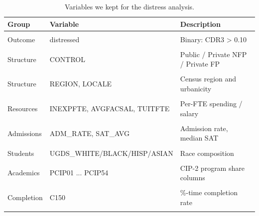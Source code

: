 \documentclass[
]{article}
\begin{document}
\begin{longtable}[t]{>{\raggedright\arraybackslash}p{1.8cm}>{\raggedright\arraybackslash}p{4.5cm}>{\raggedright\arraybackslash}p{7cm}}
\caption{\label{tab:var-table}Variables we kept for the distress analysis.}\\
\toprule
Group & Variable & Description\\
\midrule
\cellcolor{gray!10}{Outcome} & \cellcolor{gray!10}{CDR3} & \cellcolor{gray!10}{3-yr cohort default rate}\\
Outcome & distressed & Binary: CDR3 > 0.10\\
\cellcolor{gray!10}{Identifier} & \cellcolor{gray!10}{UNITID, OPEID, INSTNM} & \cellcolor{gray!10}{Institution ID and name}\\
Structure & CONTROL & Public / Private NFP / Private FP\\
\cellcolor{gray!10}{Structure} & \cellcolor{gray!10}{PREDDEG} & \cellcolor{gray!10}{Predominant degree awarded}\\
\addlinespace
Structure & REGION, LOCALE & Census region and urbanicity\\
\cellcolor{gray!10}{Structure} & \cellcolor{gray!10}{HBCU, HSI, DISTANCEONLY} & \cellcolor{gray!10}{Institution-type flags}\\
Resources & INEXPFTE, AVGFACSAL, TUITFTE & Per-FTE spending / salary\\
\cellcolor{gray!10}{Resources} & \cellcolor{gray!10}{PFTFAC, STUFACR} & \cellcolor{gray!10}{Full-time faculty \%, student:faculty}\\
Admissions & ADM\_RATE, SAT\_AVG & Admission rate, median SAT\\
\addlinespace
\cellcolor{gray!10}{Students} & \cellcolor{gray!10}{UGDS, PCTPELL, PCTFLOAN} & \cellcolor{gray!10}{Enrollment, Pell / loan share}\\
Students & UGDS\_WHITE/BLACK/HISP/ASIAN & Race composition\\
\cellcolor{gray!10}{Students} & \cellcolor{gray!10}{FEMALE, UG25ABV} & \cellcolor{gray!10}{Female share, adult learner share}\\
Academics & PCIP01 ... PCIP54 & 38 CIP-2 program share columns\\
\cellcolor{gray!10}{Cost} & \cellcolor{gray!10}{NPT4} & \cellcolor{gray!10}{Avg net price (coalesced pub/priv)}\\
\addlinespace
Completion & C150 & 150\%-time completion rate\\
\cellcolor{gray!10}{Debt} & \cellcolor{gray!10}{GRAD\_DEBT\_MDN} & \cellcolor{gray!10}{Median graduate debt}\\
\bottomrule
\end{longtable}
\endgroup{}
\end{document}
